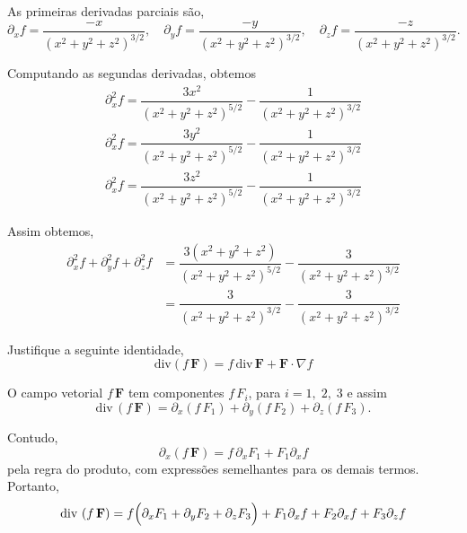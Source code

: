 \solo
As primeiras derivadas parciais são,
\begin{equation*}
	\partial_{x}f=\dfrac{-x}{(x^{2}+y^{2}+z^{2})^{3/2}}, \quad \partial_{y}f=\dfrac{-y}{(x^{2}+y^{2}+z^{2})^{3/2}},
	\quad \partial_{z}f=\dfrac{-z}{(x^{2}+y^{2}+z^{2})^{3/2}}.
\end{equation*}

Computando as segundas derivadas, obtemos
\begin{align*}
	\partial^{2}_{x}f=\dfrac{3x^{2}}{(x^{2}+y^{2}+z^{2})^{5/2}}-\dfrac{1}{(x^{2}+y^{2}+z^{2})^{3/2}}\\[2ex]
	\partial^{2}_{x}f=\dfrac{3y^{2}}{(x^{2}+y^{2}+z^{2})^{5/2}}-\dfrac{1}{(x^{2}+y^{2}+z^{2})^{3/2}}\\[2ex]
	\partial^{2}_{x}f=\dfrac{3z^{2}}{(x^{2}+y^{2}+z^{2})^{5/2}}-\dfrac{1}{(x^{2}+y^{2}+z^{2})^{3/2}}
\end{align*}

Assim obtemos,
\begin{align*}
	\partial_{x}^{2}f+\partial_{y}^{2}f+\partial_{z}^{2}f &=
	\dfrac{3(x^{2}+y^{2}+z^{2})}{(x^{2}+y^{2}+z^{2})^{5/2}}-\dfrac{3}{(x^{2}+y^{2}+z^{2})^{3/2}}\\[2ex]
	&=\dfrac{3}{(x^{2}+y^{2}+z^{2})^{3/2}}-\dfrac{3}{(x^{2}+y^{2}+z^{2})^{3/2}}
\end{align*}


\begin{exc}\label{exer:1-5}
	Justifique a seguinte identidade,
	\begin{equation*}
		\mathrm{div}\left(f\, \mathbf{F} \right)= f\, \mathrm{div}\, \mathbf{F}+ \mathbf{F}\cdot \nabla f
	\end{equation*}
\end{exc}

\solo
O campo vetorial \(f\,\mathbf{F}\) tem componentes \(f\,F_{i}\), para \(i = 1,\; 2,\; 3\) e assim
\begin{equation*}
	\mathrm{div}\,\left(f\, \mathbf{F}\right) = \partial_{x}\left(f\, F_{1} \right)+\partial_{y}\left(f\, F_{2}\right)+\partial_{z}\left(f\,F_{3}\right).
\end{equation*}

Contudo,
\begin{equation*}
	\partial_{x}\left(f\, \mathbf{F}\right) = f\, \partial_{x}F_{1}+F_{1}\partial_{x}f
\end{equation*}
pela regra do produto, com expressões semelhantes para os demais termos. Portanto,
\begin{align*}
	\mathrm{div}\,\left(f\, \mathbf{F}\right) = f\Bigl(\partial_{x}F_{1}+\partial_{y}F_{2}+\partial_{z}F_{3}\Bigr) +
	F_{1}\partial_{x}f+F_{2}\partial_{x}f+F_{3}\partial_{z}f
\end{align*}

